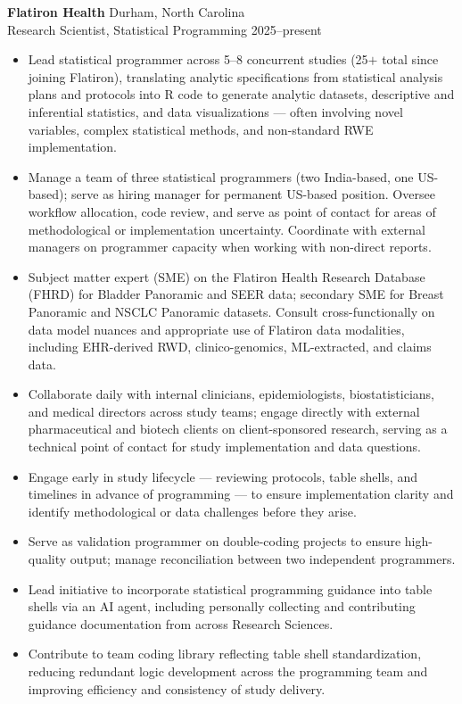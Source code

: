 \textbf{Flatiron Health} \hfill Durham, North Carolina \\
Research Scientist, Statistical Programming \hfill 2025--present
\begin{itemize}
    \itemsep0em
    \item Lead statistical programmer across 5--8 concurrent studies (25$+$ total since joining Flatiron), translating analytic specifications from statistical analysis plans and protocols into R code to generate analytic datasets, descriptive and inferential statistics, and data visualizations — often involving novel variables, complex statistical methods, and non-standard RWE implementation.
    \item Manage a team of three statistical programmers (two India-based, one US-based); serve as hiring manager for permanent US-based position. Oversee workflow allocation, code review, and serve as point of contact for areas of methodological or implementation uncertainty. Coordinate with external managers on programmer capacity when working with non-direct reports.
    \item Subject matter expert (SME) on the Flatiron Health Research Database (FHRD) for Bladder Panoramic and SEER data; secondary SME for Breast Panoramic and NSCLC Panoramic datasets. Consult cross-functionally on data model nuances and appropriate use of Flatiron data modalities, including EHR-derived RWD, clinico-genomics, ML-extracted, and claims data.
    \item Collaborate daily with internal clinicians, epidemiologists, biostatisticians, and medical directors across study teams; engage directly with external pharmaceutical and biotech clients on client-sponsored research, serving as a technical point of contact for study implementation and data questions.
    \item Engage early in study lifecycle — reviewing protocols, table shells, and timelines in advance of programming — to ensure implementation clarity and identify methodological or data challenges before they arise.
    \item Serve as validation programmer on double-coding projects to ensure high-quality output; manage reconciliation between two independent programmers.
    \item Lead initiative to incorporate statistical programming guidance into table shells via an AI agent, including personally collecting and contributing guidance documentation from across Research Sciences.
    \item Contribute to team coding library reflecting table shell standardization, reducing redundant logic development across the programming team and improving efficiency and consistency of study delivery.

\end{itemize}
